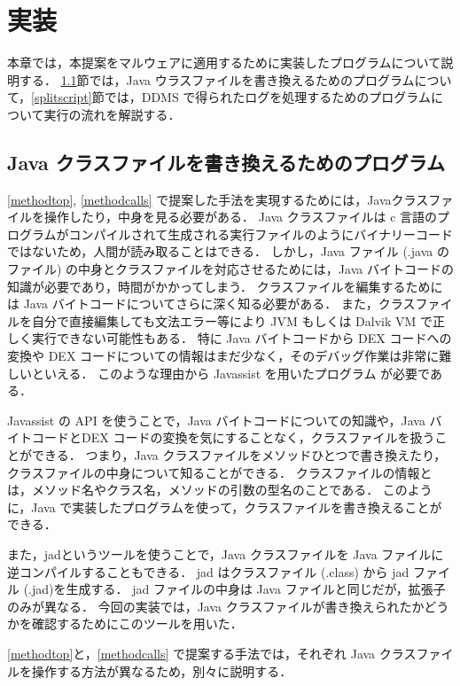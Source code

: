 \section{実装}
\label{sec:instrument}
本章では，本提案をマルウェアに適用するために実装したプログラムについて説明する．
\ref{programforclass}節では，Java ウラスファイルを書き換えるためのプログラムについて，\ref{splitscript}節では，DDMS で得られたログを処理するためのプログラムについて実行の流れを解説する．

\subsection{Java クラスファイルを書き換えるためのプログラム}
\label{programforclass}
\ref{methodtop}, \ref{methodcalls} で提案した手法を実現するためには，Javaクラスファイルを操作したり，中身を見る必要がある．
Java クラスファイルは c 言語のプログラムがコンパイルされて生成される実行ファイルのようにバイナリーコードではないため，人間が読み取ることはできる．
しかし，Java ファイル (.java のファイル) の中身とクラスファイルを対応させるためには，Java バイトコードの知識が必要であり，時間がかかってしまう．
クラスファイルを編集するためには Java バイトコードについてさらに深く知る必要がある．
また，クラスファイルを自分で直接編集しても文法エラー等により JVM もしくは Dalvik VM で正しく実行できない可能性もある．
特に Java バイトコードから DEX コードへの変換や DEX コードについての情報はまだ少なく，そのデバッグ作業は非常に難しいといえる．
このような理由から Javassist\cite{javassist} を用いたプログラム が必要である．

Javassist の API を使うことで，Java バイトコードについての知識や，Java バイトコードとDEX コードの変換を気にすることなく，クラスファイルを扱うことができる．
つまり，Java クラスファイルをメソッドひとつで書き換えたり，クラスファイルの中身について知ることができる．
クラスファイルの情報とは，メソッド名やクラス名，メソッドの引数の型名のことである．
このように，Java で実装したプログラムを使って，クラスファイルを書き換えることができる．

また，jad\cite{jad}というツールを使うことで，Java クラスファイルを Java ファイルに逆コンパイルすることもできる．
jad はクラスファイル (.class) から jad ファイル (.jad)を生成する．
jad ファイルの中身は Java ファイルと同じだが，拡張子のみが異なる．
今回の実装では，Java クラスファイルが書き換えられたかどうかを確認するためにこのツールを用いた．

\ref{methodtop}と，\ref{methodcalls} で提案する手法では，それぞれ Java クラスファイルを操作する方法が異なるため，別々に説明する．

